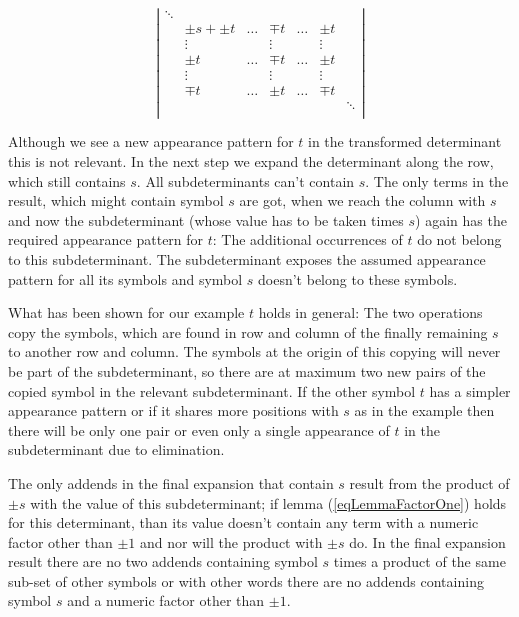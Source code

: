 \begin{equation}
\label{eqDetWithSingleSAndTheTs}
\left|
\begin{array}{ccccccc}
\ddots &               &        &        &        &        &        \\
       & \pm s + \pm t & \ldots & \mp t  & \ldots & \pm t  &        \\
       & \vdots        &        & \vdots &        & \vdots &        \\
       &         \pm t & \ldots & \mp t  & \ldots & \pm t  &        \\
       & \vdots        &        & \vdots &        & \vdots &        \\
       &         \mp t & \ldots & \pm t  & \ldots & \mp t  &        \\
       &               &        &        &        &        & \ddots \\
\end{array}
\right|
\end{equation}

\noindent
Although we see a new appearance pattern for $t$ in the transformed
determinant this is not relevant. In the next step we expand the
determinant along the row, which still contains $s$. All subdeterminants
can't contain $s$. The only terms in the result, which might contain
symbol $s$ are got, when we reach the column with $s$ and now the
subdeterminant (whose value has to be taken times $s$) again has the
required appearance pattern for $t$: The additional occurrences of $t$ do
not belong to this subdeterminant. The subdeterminant exposes the assumed
appearance pattern for all its symbols and symbol $s$ doesn't belong to
these symbols.

What has been shown for our example $t$ holds in general: The two
operations copy the symbols, which are found in row and column of the
finally remaining $s$ to another row and column. The symbols at the origin
of this copying will never be part of the subdeterminant, so there are at
maximum two new pairs of the copied symbol in the relevant subdeterminant.
If the other symbol $t$ has a simpler appearance pattern or if it shares
more positions with $s$ as in the example then there will be only one pair
or even only a single appearance of $t$ in the subdeterminant due to
elimination.

The only addends in the final expansion that contain $s$ result from the
product of $\pm s$ with the value of this subdeterminant; if lemma
(\ref{eqLemmaFactorOne}) holds for this determinant, than its value
doesn't contain any term with a numeric factor other than $\pm 1$ and nor
will the product with $\pm s$ do. In the final expansion result there are
no two addends containing symbol $s$ times a product of the same sub-set
of other symbols or with other words there are no addends containing
symbol $s$ and a numeric factor other than $\pm 1$.

